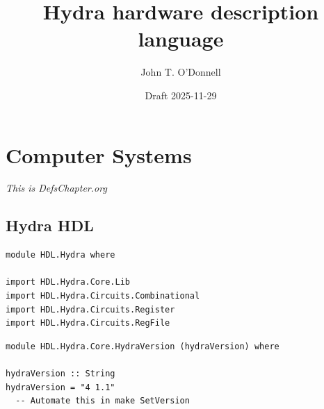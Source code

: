 \documentclass[]{svmono}
\author{John T. O'Donnell}
\date{Draft 2025-11-29}
\title{Hydra hardware description language}
\begin{document}
\maketitle
\setcounter{tocdepth}{6}
\tableofcontents

\setlength\evensidemargin{25pt}
\setlength\oddsidemargin{25pt}
\part*{Computer Systems}
\label{sec:org07ec685}

\emph{This is DefsChapter.org}
\chapter*{Hydra HDL}
\label{sec:orgecb9c2d}

\begin{verbatim}
module HDL.Hydra where

import HDL.Hydra.Core.Lib
import HDL.Hydra.Circuits.Combinational
import HDL.Hydra.Circuits.Register
import HDL.Hydra.Circuits.RegFile
\end{verbatim}

\begin{verbatim}
module HDL.Hydra.Core.HydraVersion (hydraVersion) where

hydraVersion :: String
hydraVersion = "4 1.1"
  -- Automate this in make SetVersion
\end{verbatim}
\end{document}

